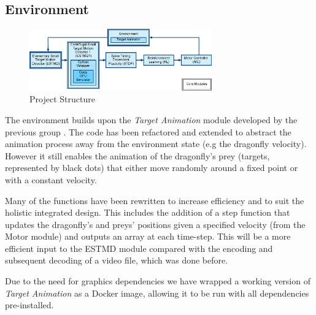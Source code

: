 \subsection{Environment}

\begin{figure}
    \centering
    \includegraphics[width = 0.7\textwidth]{Figures/Project_Structure_Revised-2.eps}
    \caption{Project Structure}
    \label{fig:structure}
\end{figure}

The environment builds upon the \textit{Target Animation} module developed by the previous group \cite{GITHUB1}. The code has been refactored and extended to abstract the animation process away from the environment state (e.g the dragonfly velocity). However it still enables the animation of the dragonfly's prey (targets, represented by black dots) that either move randomly around a fixed point or with a constant velocity.

Many of the functions have been rewritten to increase efficiency and to suit the holistic integrated design. This includes the addition of a step function that updates the dragonfly's and preys' positions given a specified velocity (from the Motor module) and outputs an array at each time-step. This will be a more efficient input to the ESTMD module compared with the encoding and subsequent decoding of a video file, which was done before.

Due to the need for graphics dependencies we have wrapped a working version of \textit{Target Animation} as a Docker image, allowing it to be run with all dependencies pre-installed.